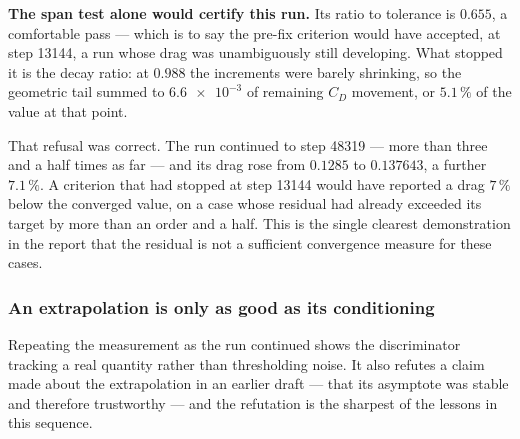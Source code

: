 \noindent \textbf{The span test alone would certify this run.} Its ratio to tolerance is
$0.655$, a comfortable pass --- which is to say the pre-fix criterion would have accepted,
at step \num{13144}, a run whose drag was unambiguously still developing. What stopped it
is the decay ratio: at $0.988$ the increments were barely shrinking, so the geometric tail
summed to $\num{6.6e-3}$ of remaining $C_D$ movement, or $5.1\,\%$ of the value at that
point.

That refusal was correct. The run continued to step \num{48319} --- more than three and a
half times as far --- and its drag rose from $0.1285$ to $0.137643$, a further $7.1\,\%$.
A criterion that had stopped at step \num{13144} would have reported a drag $7\,\%$ below
the converged value, on a case whose residual had already exceeded its target by more than
an order and a half. This is the single clearest demonstration in the report that the
residual is not a sufficient convergence measure for these cases.

\subsubsection{An extrapolation is only as good as its conditioning}
\label{sec:conditioning}

Repeating the measurement as the run continued shows the discriminator tracking a real
quantity rather than thresholding noise. It also refutes a claim made about the
extrapolation in an earlier draft --- that its asymptote was stable and therefore
trustworthy --- and the refutation is the sharpest of the lessons in this sequence.

